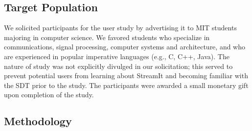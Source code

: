 \documentclass[times, 10pt,twocolumn]{article}
\begin{document}

\subsection{Target Population}

We solicited participants for the  user study by advertising it to MIT
students  majoring  in  computer  science.  We  favored  students  who
specialize in communications,  signal processing, computer systems and
architecture, and who are  experienced in popular imperative languages
(e.g., C, C++, Java).  The nature of study was not explicitly divulged
in  our solicitation;  this  served to  prevent  potential users  from
learning about  StreamIt and becoming  familiar with the SDT  prior to
the  study. The  participants were  awarded a  small monetary  gift upon
completion of the study.


\subsection{Methodology}
\end{document}
